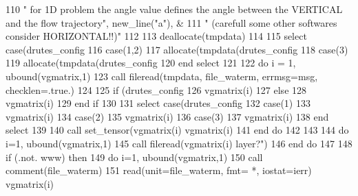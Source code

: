 \begin{DoxyCode}
{{{{{{110 \textcolor{comment}{        }\textcolor{stringliteral}{"       for 1D problem the angle value defines the angle between the VERTICAL and the flow
       trajectory"}\textcolor{comment}{, new\_line(}\textcolor{stringliteral}{"a"}\textcolor{comment}{), &}
111 \textcolor{comment}{        }\textcolor{stringliteral}{"       (carefull some other softwares consider HORIZONTAL!!)"}
112         
113       \textcolor{keyword}{deallocate}(tmpdata)
114       
115       \textcolor{keywordflow}{select case}(drutes_config%
116         \textcolor{keywordflow}{case}(1,2)
117           \textcolor{keyword}{allocate}(tmpdata(drutes_config%
118         \textcolor{keywordflow}{case}(3)
119           \textcolor{keyword}{allocate}(tmpdata(drutes_config%
120 \textcolor{keywordflow}{      end select}
121       
122       \textcolor{keywordflow}{do} i = 1, ubound(vgmatrix,1)
123         \textcolor{keyword}{call }fileread(tmpdata, file_waterm, errmsg=msg, checklen=.true.)
124         
125         \textcolor{keywordflow}{if} (drutes_config%
126           vgmatrix(i)%
127         \textcolor{keywordflow}{else}
128           vgmatrix(i)%
129 \textcolor{keywordflow}{        end if}
130         
131         \textcolor{keywordflow}{select case}(drutes_config%
132           \textcolor{keywordflow}{case}(1)
133             vgmatrix(i)%
134           \textcolor{keywordflow}{case}(2)
135             vgmatrix(i)%
136           \textcolor{keywordflow}{case}(3)
137             vgmatrix(i)%
138 \textcolor{keywordflow}{        end select}
139 
140         \textcolor{keyword}{call }set_tensor(vgmatrix(i)%
      vgmatrix(i)%
141 \textcolor{comment}{}\textcolor{keywordflow}{      end do}
142 
143       
144       \textcolor{keywordflow}{do} i=1, ubound(vgmatrix,1)
145         \textcolor{keyword}{call }fileread(vgmatrix(i)%
       layer?"}\textcolor{comment}{)}
146 \textcolor{comment}{}\textcolor{keywordflow}{      end do}
147       
148       \textcolor{keywordflow}{if} (.not. www) \textcolor{keywordflow}{then}
149         \textcolor{keywordflow}{do} i=1, ubound(vgmatrix,1)
150           \textcolor{keyword}{call }comment(file_waterm)
151           \textcolor{keyword}{read}(unit=file_waterm, fmt= *, iostat=ierr) vgmatrix(i)%
}}}}}
\end{DoxyCode}
